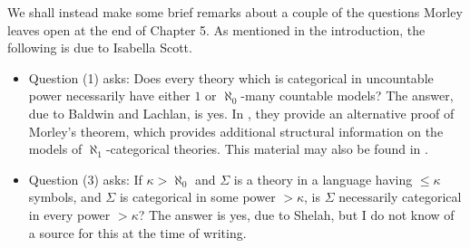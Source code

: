 \documentclass{article}
\theoremstyle{nonumberplain}
\begin{document}
We shall instead make some brief remarks about a couple of the questions Morley leaves open at the end of Chapter 5. As mentioned in the introduction, the following is due to Isabella Scott.

\begin{itemize}
\item Question (1) asks: Does every theory which is categorical in uncountable power necessarily have either $1$ or $\aleph_0$-many countable models? The answer, due to Baldwin and Lachlan, is yes. In \cite{baldwin_lachlan}, they provide an alternative proof of Morley's theorem, which provides additional structural information on the models of $\aleph_1$-categorical theories. This material may also be found in \cite{baldwin_stability_theory}.

\item Question (3) asks: If $\kappa > \aleph_0$ and $\Sigma$ is a theory in a language having $\leq \kappa$ symbols, and $\Sigma$ is categorical in some power $>\kappa$, is $\Sigma$ necessarily categorical in every power $>\kappa$? The answer is yes, due to Shelah, but I do not know of a source for this at the time of writing.
\end{itemize}



\end{document}

